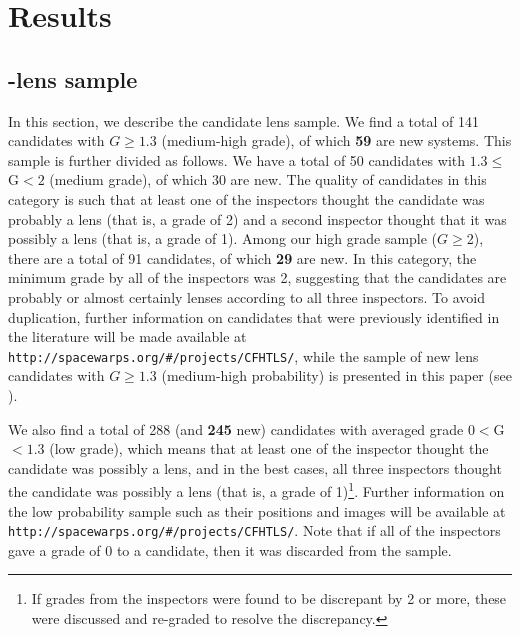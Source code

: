 \documentclass[useAMS,usenatbib,a4paper]{mn2e}
\begin{document}
\section{Results}
\label{sec:results}

\subsection{\sw-\cfhtls lens sample}
\label{sec:swlens}

In this section, we describe the \cfhtls \sw candidate lens sample.
We find a total of 141 candidates with
$G\ge1.3$ (medium-high grade), of which {\bf 59} are new
systems. This sample is further divided as follows. We have a total of
50 candidates with $1.3\le$G$<2$ (medium grade), of
which 30 are new. The quality of candidates in this category is such
that at least one of the inspectors thought the candidate was
probably a lens (that is, a grade of 2) and a second inspector thought
that it was possibly a lens (that is, a grade of 1). Among our high
grade sample ($G\ge$2), there are a total of 91 candidates, of
which {\bf 29} are new. In this category, the minimum grade by all of the
inspectors was 2, suggesting that the candidates are probably or almost
certainly lenses according to all three inspectors. To avoid
duplication, further information on \sw candidates that were previously
identified in the literature will be made available at
\texttt{http://spacewarps.org/\#/projects/CFHTLS/}, while the sample of new lens
candidates with $G\ge 1.3$ (medium-high probability) is presented in
this paper (see ).


We also find a total of 288 (and {\bf 245} new) candidates with averaged grade
$0<$G$<1.3$ (low grade), which means that at
least one of the inspector thought the candidate was possibly a lens, and
in the best cases, all three inspectors thought the candidate was possibly
a lens (that is, a grade of 1)\footnote{If grades from the inspectors
were found to be discrepant by 2 or more, these were discussed and
re-graded to resolve the discrepancy.}. Further information on the low
probability sample such as their positions and images will be available
at \texttt{http://spacewarps.org/\#/projects/CFHTLS/}. Note that if all of the
inspectors gave a grade of 0 to a candidate, then it was discarded from
the sample.
\end{document}

